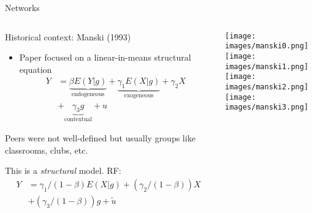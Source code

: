 \documentclass[notes,11pt, aspectratio=169]{beamer}
\newenvironment{wideitemize}{\itemize\addtolength{\itemsep}{10pt}}{\enditemize}
\begin{document}
\begin{frame}{Networks}
\begin{columns}[T] %
  \begin{column}{.5\textwidth}
    \begin{wideitemize}
    \item Historical context: Manski (1993)
      \begin{itemize}
      \item Paper focused on a linear-in-means structural equation
        \begin{align*}
          Y &= \underbrace{\beta E(Y|g)}_{\text{endogeneous}} + \underbrace{\gamma_{1} E(X|g)}_{\text{exogeneous}} + \gamma_{2} X\\
          &+ \underbrace{\gamma_{3} g}_{\text{contextual}} + u 
        \end{align*}
      \end{itemize}
    \item Peers were not well-defined but usually groups like
      classrooms, clubs, etc.
    \item This is a \emph{structural} model. RF:
      \begin{align*}
        Y &=  \gamma_{1}/(1-\beta) E(X|g) + (\gamma_{2}/(1-\beta)) X\\
          &+ (\gamma_{3}/(1-\beta)) g + \tilde{u} 
        \end{align*}

    \end{wideitemize}
  \end{column}%
  \hfill%
  \begin{column}{.5\textwidth}
    \begin{center}
      \texttt{[image: images/manski0.png]}\\
      \texttt{[image: images/manski1.png]}\\
      \texttt{[image: images/manski2.png]}\\
      \texttt{[image: images/manski3.png]}            
    \end{center}
  \end{column}
\end{columns}
\end{frame}
\end{document}
